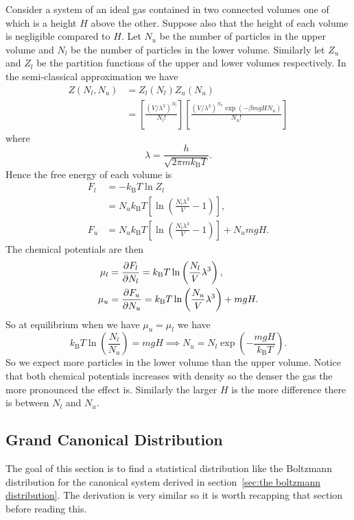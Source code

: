 \documentclass[a4paper]{article}
\newcommand{\boltzmann}{k_\mathrm{B}}
\begin{document}
    \begin{example}\label{exa:ideal gas semi classical approx chemical potential}
        Consider a system of an ideal gas contained in two connected volumes one of which is a height \(H\) above the other.
        Suppose also that the height of each volume is negligible compared to \(H\).
        Let \(N_u\) be the number of particles in the upper volume and \(N_l\) be the number of particles in the lower volume.
        Similarly let \(Z_u\) and \(Z_l\) be the partition functions of the upper and lower volumes respectively.
        In the semi-classical approximation we have
        \begin{align*}
            Z(N_l, N_u) &= Z_l(N_l)Z_u(N_u)\\
            &= \left[ \frac{(V/\lambda^3)^{N_l}}{N_l!} \right] \left[ \frac{(V/\lambda^3)^{N_u}\exp(-\beta mg HN_u)}{N_u!} \right]
        \end{align*}
        where
        \[\lambda = \frac{h}{\sqrt{2\pi m\boltzmann T}}.\]
        Hence the free energy of each volume is
        \begin{align*}
            F_l &= -\boltzmann T\ln Z_l\\
            &= N_u\boltzmann T\left[ \ln\left( \frac{N_l\lambda^3}{V} - 1 \right) \right],\\
            F_u &= N_u\boltzmann T\left[ \ln\left( \frac{N_l\lambda^3}{V} - 1 \right) \right] + N_umgH.
        \end{align*}
        The chemical potentials are then
        \begin{align*}
            \mu_l &= \pdv{F_l}{N_l} = \boltzmann T\ln\left( \frac{N_l}{V}\lambda^3 \right),\\
            \mu_u &= \pdv{F_u}{N_u} = \boltzmann T\ln\left( \frac{N_u}{V}\lambda^3 \right) + mgH.\\
        \end{align*}
        So at equilibrium when we have \(\mu_u = \mu_l\) we have
        \[\boltzmann T\ln\left( \frac{N_l}{N_u} \right) = mgH \implies N_u = N_l\exp\left( -\frac{mgH}{\boltzmann T} \right).\]
        So we expect more particles in the lower volume than the upper volume.
        Notice that both chemical potentials increases with density so the denser the gas the more pronounced the effect is.
        Similarly the larger \(H\) is the more difference there is between \(N_l\) and \(N_u\).
    \end{example}
    \subsection{Grand Canonical Distribution}
    The goal of this section is to find a statistical distribution like the Boltzmann distribution for the canonical system derived in section~\ref{sec:the boltzmann distribution}.
    The derivation is very similar so it is worth recapping that section before reading this.
    
\end{document}
